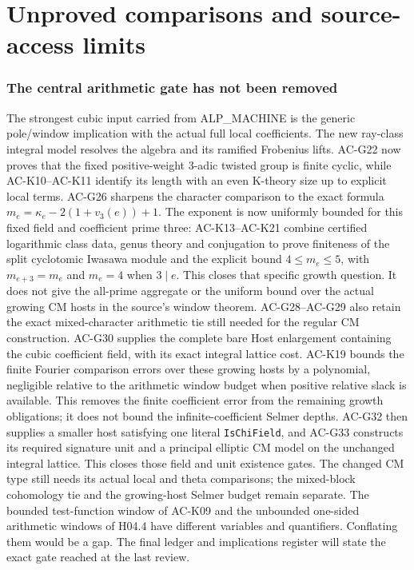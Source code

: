 \documentclass[11pt,a4paper]{article}
\theoremstyle{definition}
\theoremstyle{remark}
\begin{document}
\part{Unproved comparisons and source-access limits}
\section{The central arithmetic gate has not been removed}
The strongest cubic input carried from ALP\_MACHINE is the
generic pole/window implication with the actual full local
coefficients. The new ray-class integral model resolves
the algebra and its ramified Frobenius lifts. AC-G22 now
proves that the fixed positive-weight $3$-adic twisted
group is finite cyclic, while AC-K10--AC-K11 identify its
length with an even K-theory size up to explicit local
terms. AC-G26 sharpens the character comparison to the
exact formula $m_e=\kappa_e-2(1+v_3(e))+1$. The exponent
is now uniformly bounded for this fixed field and coefficient
prime three: AC-K13--AC-K21 combine certified logarithmic
class data, genus theory and conjugation to prove finiteness
of the split cyclotomic Iwasawa module and the explicit
bound $4\leq m_e\leq5$, with $m_{e+3}=m_e$ and
$m_e=4$ when $3\mid e$. This closes that
specific growth question. It does not give the all-prime
aggregate or the uniform bound over the actual growing
CM hosts in the source's window theorem. AC-G28--AC-G29
also retain the exact mixed-character arithmetic tie still
needed for the regular CM construction. AC-G30 supplies
the complete bare Host enlargement containing the cubic
coefficient field, with its exact integral lattice cost.
AC-K19 bounds the finite Fourier comparison errors over
these growing hosts by a polynomial, negligible relative
to the arithmetic window budget when positive relative
slack is available. This removes the finite coefficient
error from the remaining growth obligations; it does not
bound the infinite-coefficient Selmer depths.
AC-G32 then supplies a smaller host satisfying one literal
\texttt{IsChiField}, and AC-G33 constructs its required
signature unit and a principal elliptic CM model on the
unchanged integral lattice. This closes those field and unit
existence gates. The changed CM type still needs its actual
local and theta comparisons; the mixed-block cohomology tie
and the growing-host Selmer budget remain separate.
The bounded test-function window of AC-K09 and the
unbounded one-sided arithmetic windows of H04.4 have
different variables and quantifiers. Conflating them
would be a gap. The final ledger and implications register
will state the exact gate reached at the last review.
\end{document}
